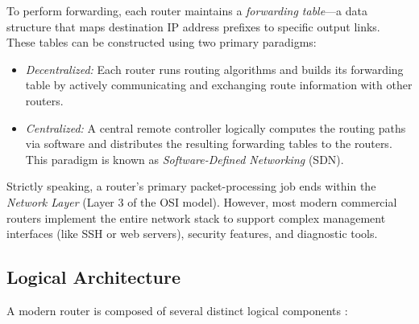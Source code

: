 To perform forwarding, each router maintains a \emph{forwarding table}—a data structure that maps destination IP address prefixes to specific output links. These tables can be constructed using two primary paradigms:
\begin{itemize}
    \item \emph{Decentralized:} Each router runs routing algorithms and builds its forwarding table by actively communicating and exchanging route information with other routers.
    \item \emph{Centralized:} A central remote controller logically computes the routing paths via software and distributes the resulting forwarding tables to the routers. This paradigm is known as \emph{Software-Defined Networking} (SDN).
\end{itemize}

Strictly speaking, a router's primary packet-processing job ends within the \emph{Network Layer} (Layer 3 of the OSI model). However, most modern commercial routers implement the entire network stack to support complex management interfaces (like SSH or web servers), security features, and diagnostic tools.

\subsection{Logical Architecture}
A modern router is composed of several distinct logical components \cite{kurose2017}:

